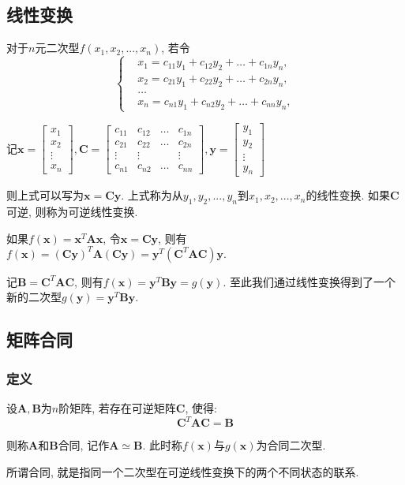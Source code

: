 \subsection{线性变换}
对于$ n $元二次型$ f(x_{1}, x_{2},... ,x_{n}) $, 若令
\begin{equation*}
\left\{
\begin{aligned}
& x_{1} = c_{11}y_{1}+c_{12}y_{2}+\dots +c_{1n}y_{n}, \\
& x_{2} = c_{21}y_{1}+c_{22}y_{2}+\dots +c_{2n}y_{n}, \\
& \dots \\
& x_{n} = c_{n1}y_{1}+c_{n2}y_{2}+\dots +c_{nn}y_{n},
\end{aligned}
\right.
\end{equation*}\par
记$ \bm{x}=
\begin{bmatrix}
x_1 \\
x_2 \\
\vdots \\
x_n
\end{bmatrix}, \bm{C}=
\begin{bmatrix}
c_{11} & c_{12} & \dots & c_{1n} \\
c_{21} & c_{22} & \dots & c_{2n} \\
\vdots & \vdots &  & \vdots \\
c_{n1} & c_{n2} & \dots & c_{nn}
\end{bmatrix}, \bm{y}=
\begin{bmatrix}
y_1 \\
y_2 \\
\vdots \\
y_n
\end{bmatrix}$\par \vspace{1em}
则上式可以写为$ \bm{x}=\bm{C}\bm{y} $. 上式称为从$ y_{1}, y_{2},... ,y_{n} $到$ x_{1}, x_{2},... ,x_{n} $的线性变换. 如果$ \bm{C} $可逆, 则称为可逆线性变换.\par
如果$ f(\bm{x})=\bm{x}^{T}\bm{A}\bm{x} $, 令$ \bm{x}=\bm{C}\bm{y} $, 则有$ f(\bm{x})=(\bm{C}\bm{y})^{T}\bm{A}(\bm{C}\bm{y})=\bm{y}^{T}(\bm{C}^{T}\bm{A}\bm{C})\bm{y}. $\par
记$ \bm{B}=\bm{C}^{T}\bm{A}\bm{C} $, 则有$ f(\bm{x})=\bm{y}^{T}\bm{B}\bm{y}=g(\bm{y}) $. 至此我们通过线性变换得到了一个新的二次型$g(\bm{y})=\bm{y}^{T}\bm{B}\bm{y}$.
\subsection{矩阵合同}
\subsubsection{定义}
设$ \bm{A}, \bm{B} $为$ n $阶矩阵, 若存在可逆矩阵$ \bm{C} $, 使得:
\begin{equation*}
\bm{C}^{T}\bm{A}\bm{C}=\bm{B}
\end{equation*}\par
则称$ \bm{A} $和$ \bm{B} $合同, 记作$ \bm{A}\simeq \bm{B} $. 此时称$ f(\bm{x}) $与$ g(\bm{x}) $为合同二次型.\par
所谓合同, 就是指同一个二次型在可逆线性变换下的两个不同状态的联系.
